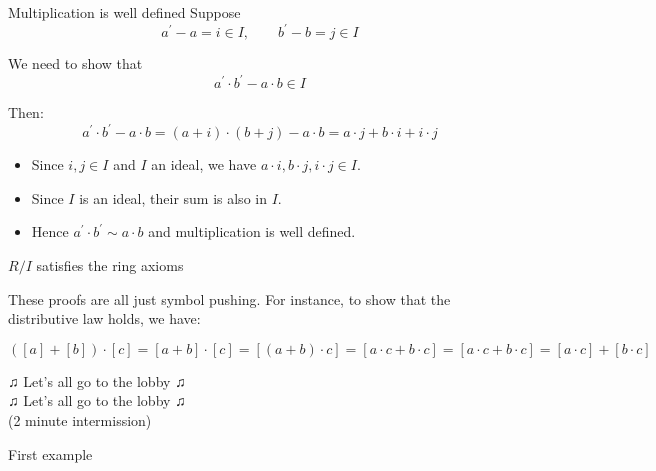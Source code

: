 \documentclass{beamer}
\begin{document}
\begin{frame}{Multiplication is well defined}
Suppose $$a^\prime-a=i\in I,\qquad b^\prime-b=j\in I$$  

We need to show that $$a^\prime\cdot b^\prime-a\cdot b\in I$$

Then:
$$a^\prime\cdot b^\prime-a\cdot b=(a+i)\cdot (b+j)-a\cdot b=a\cdot j+b\cdot i+i\cdot j$$

\begin{itemize}
\item Since $i, j\in I$ and $I$ an ideal, we have $a\cdot i, b\cdot j, i\cdot j\in I$. 
\item  Since $I$ is an ideal, their sum is also in $I$. 
\item  Hence $a^\prime\cdot b^\prime\sim a\cdot b$ and multiplication is well defined.
\end{itemize}

\end{frame}

\begin{frame}{$R/I$ satisfies the ring axioms}

These proofs are all just symbol pushing.  For instance, to show that the distributive law holds, we have:

$$([a]+[b])\cdot [c]=[a+b]\cdot[c]=[(a+b)\cdot c]=[a\cdot c+b\cdot c]=[a\cdot c+b\cdot c]=[a\cdot c]+[b\cdot c]$$



\end{frame}



\begin{frame}[plain,c]

\begin{center}

\Huge

$\twonotes$ Let's all go to the lobby $\twonotes$ \\ $\twonotes$ Let's all go to the lobby $\twonotes$ \\
(2 minute intermission)
\end{center}

\end{frame}

\begin{frame}{First example}

\end{frame}
\end{document}
